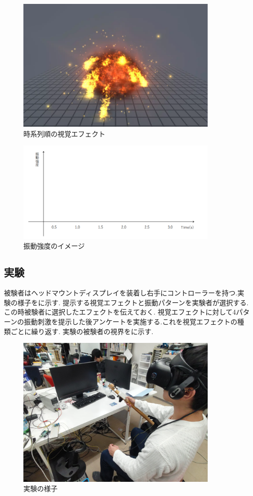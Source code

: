 \begin{figure}[h]
\centering
\includegraphics[clip,width=10cm]{./fig/explosion.png}
\caption{時系列順の視覚エフェクト}\label{expTime}
\end{figure}

\begin{figure}[h]
\centering
\includegraphics[clip,width=10cm]{./fig/ank.png}
\caption{振動強度のイメージ}\label{ank}
\end{figure}

\newpage

\subsection{実験}
被験者はヘッドマウントディスプレイを装着し右手にコントローラーを持つ.実験の様子をに示す.
提示する視覚エフェクトと振動パターンを実験者が選択する.この時被験者に選択したエフェクトを伝えておく.
視覚エフェクトに対して4パターンの振動刺激を提示した後アンケートを実施する.これを視覚エフェクトの種類ごとに繰り返す.
実験の被験者の視界をに示す.

\begin{figure}[h]
\centering
\includegraphics[clip,width=10cm]{./fig/jikken.png}
\caption{実験の様子}\label{jikken}
\end{figure}


